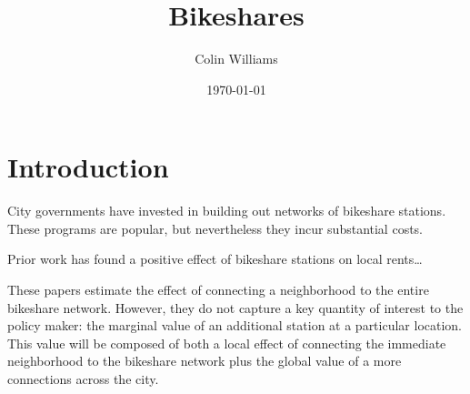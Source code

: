 \documentclass[letterpaper]{article}
\author{Colin Williams}
\date{\today}
\title{Bikeshares}
\begin{document}
\maketitle

\section{Introduction}
\label{sec:orgf3ff886}

City governments have invested in building out networks of bikeshare stations. These programs are popular, but nevertheless they incur substantial costs.

Prior work has found a positive effect of bikeshare stations on local rents\ldots{} 

These papers estimate the effect of connecting a neighborhood to the entire bikeshare network. However, they do not capture a key quantity of interest to the policy maker: the marginal value of an additional station at a particular location. This value will be composed of both a local effect of connecting the immediate neighborhood to the bikeshare network plus the global value of a more connections across the city.
\end{document}
